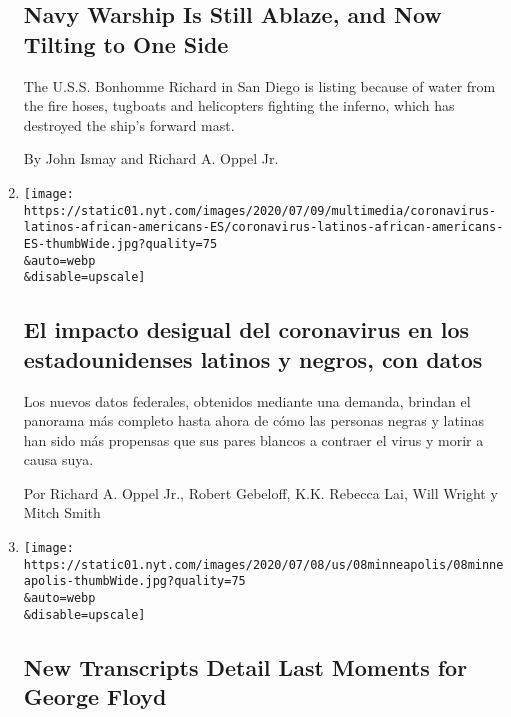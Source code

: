 \begin{enumerate}
  \hypertarget{navy-warship-is-still-ablaze-and-now-tilting-to-one-side}{%
  \subsection{Navy Warship Is Still Ablaze, and Now Tilting to One
  Side}\label{navy-warship-is-still-ablaze-and-now-tilting-to-one-side}}

  The U.S.S. Bonhomme Richard in San Diego is listing because of water
  from the fire hoses, tugboats and helicopters fighting the inferno,
  which has destroyed the ship's forward mast.

  By John Ismay and Richard A. Oppel Jr.
\item
  \href{/es/interactive/2020/07/09/espanol/mundo/coronavirus-latinos-africanoamericanos-datos.html}{}

  \texttt{[image: https://static01.nyt.com/images/2020/07/09/multimedia/coronavirus-latinos-african-americans-ES/coronavirus-latinos-african-americans-ES-thumbWide.jpg?quality=75\\\&auto=webp\\\&disable=upscale]}

  \hypertarget{el-impacto-desigual-del-coronavirus-en-los-estadounidenses-latinos-y-negros-con-datos}{%
  \subsection{El impacto desigual del coronavirus en los estadounidenses
  latinos y negros, con
  datos}\label{el-impacto-desigual-del-coronavirus-en-los-estadounidenses-latinos-y-negros-con-datos}}

  Los nuevos datos federales, obtenidos mediante una demanda, brindan el
  panorama más completo hasta ahora de cómo las personas negras y
  latinas han sido más propensas que sus pares blancos a contraer el
  virus y morir a causa suya.

  Por Richard A. Oppel Jr., Robert Gebeloff, K.K. Rebecca Lai, Will
  Wright y Mitch Smith
\item
  \href{/2020/07/08/us/george-floyd-body-camera-transcripts.html}{}

  \texttt{[image: https://static01.nyt.com/images/2020/07/08/us/08minneapolis/08minneapolis-thumbWide.jpg?quality=75\\\&auto=webp\\\&disable=upscale]}

  \hypertarget{new-transcripts-detail-last-moments-for-george-floyd}{%
  \subsection{New Transcripts Detail Last Moments for George
  Floyd}\label{new-transcripts-detail-last-moments-for-george-floyd}}


\end{enumerate}
